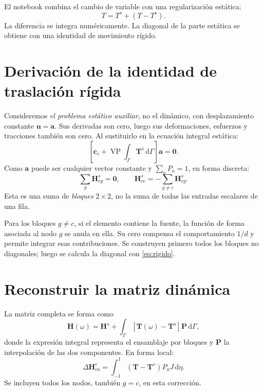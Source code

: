 \documentclass[11pt,a4paper]{report}
\numberwithin{equation}{chapter}
\newcommand{\vect}[1]{\bm{#1}}
\newcommand{\dd}{\,\mathrm{d}}
\newcommand{\VP}{\operatorname{VP}}
\begin{document}
El notebook combina el cambio de variable con una regularizaci\'on
est\'atica:
\begin{equation}
  T=T^s+(T-T^s).
\end{equation}
La diferencia se integra num\'ericamente. La diagonal de la parte
est\'atica se obtiene con una identidad de movimiento r\'igido.

\section{Derivaci\'on de la identidad de traslaci\'on r\'igida}
Consideremos \emph{el problema est\'atico auxiliar}, no el din\'amico,
con desplazamiento constante $\vect u=\vect a$.
Sus derivadas son cero, luego sus deformaciones, esfuerzos y tracciones
tambi\'en son cero.
Al sustituirlo en la ecuaci\'on integral est\'atica:
\begin{equation}
 \left[\vect c_c+\VP\int_\Gamma\vect T^s\dd\Gamma\right]\vect a=\vect0.
\end{equation}
Como $\vect a$ puede ser cualquier vector constante y
$\sum_aP_a=1$, en forma discreta:
\begin{equation}
  \sum_g\vect H^s_{cg}=\vect0,\qquad
  \boxed{\vect H^s_{cc}=-\sum_{g\ne c}\vect H^s_{cg}.}
  \label{eq:rigido}
\end{equation}
Esta es una suma de \emph{bloques} $2\times2$, no la suma de todas
las entradas escalares de una fila.

Para los bloques $g\ne c$, si el elemento contiene la fuente,
la funci\'on de forma asociada al nodo $g$ se anula en ella.
Su cero compensa el comportamiento $1/d$ y permite integrar esas
contribuciones. Se construyen primero todos los bloques no diagonales;
luego se calcula la diagonal con \eqref{eq:rigido}.

\section{Reconstruir la matriz din\'amica}
La matriz completa se forma como
\begin{equation}
 \boxed{\vect H(\omega)=\vect H^s+
  \int_\Gamma[\vect T(\omega)-\vect T^s]\vect P\dd\Gamma,}
 \label{eq:H-regularizada}
\end{equation}
donde la expresi\'on integral representa el ensamblaje por bloques y
$\vect P$ la interpolaci\'on de las dos componentes.
En forma local:
\begin{equation}
 \Delta\vect H^e_{ca}=
   \int_{-1}^1(\vect T-\vect T^s)P_aJ\dd\eta.
\end{equation}
Se incluyen todos los nodos, tambi\'en $g=c$, en esta correcci\'on.
\end{document}
